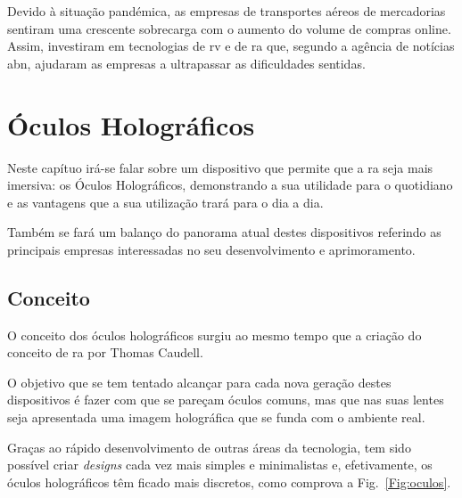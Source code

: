\documentclass{report}
\begin{document}
Devido à situação pandémica, as empresas de transportes aéreos de mercadorias sentiram uma crescente sobrecarga com o aumento do volume de compras online. Assim, investiram em tecnologias de \ac{rv} e de \ac{ra} que, segundo a agência de notícias \ac{abn}, ajudaram as empresas a ultrapassar as dificuldades sentidas.\cite{moody_2020}


\chapter{Óculos Holográficos}
\label{chap.oculos-holograficos}
Neste capítuo irá-se falar sobre um dispositivo que permite que a \ac{ra} seja mais imersiva: os Óculos Holográficos, demonstrando a sua utilidade para o quotidiano e as vantagens que a sua utilização trará para o dia a dia.

Também se fará um balanço do panorama atual destes dispositivos referindo as principais empresas interessadas no seu desenvolvimento e aprimoramento.

\section{Conceito}
O conceito dos óculos holográficos surgiu ao mesmo tempo que a criação do conceito de \ac{ra} por Thomas Caudell.

O objetivo que se tem tentado alcançar para cada nova geração destes dispositivos é fazer com que se pareçam óculos comuns, mas que nas suas lentes seja apresentada uma imagem holográfica que se funda com o ambiente real.

Graças ao rápido desenvolvimento de outras áreas da tecnologia, tem sido possível criar \textit{designs} cada vez mais simples e minimalistas e, efetivamente, os óculos holográficos têm ficado mais discretos, como comprova a Fig.~\ref{Fig:oculos}.
\end{document}
